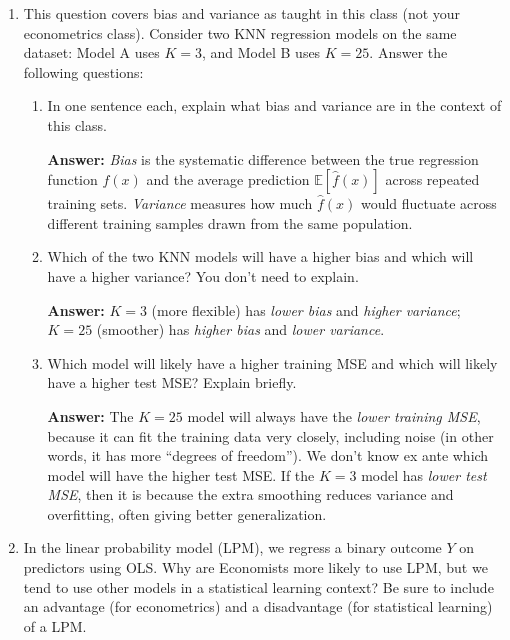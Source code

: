 \documentclass[11pt]{article}
\begin{document}
\begin{enumerate}[leftmargin=*]
\begin{enumerate}
Also acceptable: A smaller RSS will tend to give better out of sample performance when comparing two models that have the same variance. While there is no way to know the variance of models, it is usually OK to assume that models with smaller RSS will have better predictive performance if the complexity of the model is the same.
\end{enumerate}

\clearpage

\item This question covers bias and variance as taught in this class (not your econometrics class). Consider two KNN regression models on the same dataset: Model A uses $K=3$, and Model B uses $K=25$. Answer the following questions:  
\begin{enumerate}
  \item In one sentence each, explain what bias and variance are in the context of this class. 

  \textbf{Answer:} \emph{Bias} is the systematic difference between the true regression function $f(x)$ and the average prediction $\mathbb{E}[\hat f(x)]$ across repeated training sets. \emph{Variance} measures how much $\hat f(x)$ would fluctuate across different training samples drawn from the same population.

  \item Which of the two KNN models will have a higher bias and which will have a higher variance? You don't need to explain. 

  \textbf{Answer:} $K=3$ (more flexible) has \emph{lower bias} and \emph{higher variance}; $K=25$ (smoother) has \emph{higher bias} and \emph{lower variance}.

  \item Which model will likely have a higher training MSE and which will likely have a higher test MSE? Explain briefly. 

  \textbf{Answer:} The $K=25$ model will always have the \emph{lower training MSE}, because it can fit the training data very closely, including noise (in other words, it has more ``degrees of freedom''). We don't know ex ante which model will have the higher test MSE. If the $K=3$ model has \emph{lower test MSE}, then it is because the extra smoothing reduces variance and overfitting, often giving better generalization.
\end{enumerate}

\clearpage

\item In the linear probability model (LPM), we regress a binary outcome $Y$ on predictors using OLS. Why are Economists more likely to use LPM, but we tend to use other models in a statistical learning context? Be sure to include an advantage (for econometrics) and a disadvantage (for statistical learning) of a LPM. 


\end{enumerate}
\end{document}
